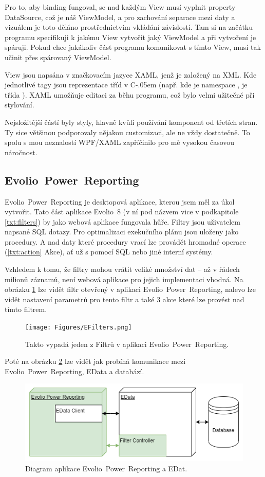 \documentclass[czech,bachelorpractice,dept460,male,csharp]{diploma}
\newcommand{\EvolioEight}{Evolio~8}
\newcommand{\EFilters}{Evolio~Power~Reporting}
\newcommand{\EData}{EData}
\newcommand{\Csharp}{%
  {\settoheight{\dimen0}{C}C\kern-.05em \resizebox{!}{\dimen0}{\raisebox{\depth}{\#}}}}
\begin{document}
			Pro to, aby binding fungoval, se nad každým View musí vyplnit property DataSource, což je náš ViewModel, a pro zachování separace mezi daty a vizuálem je toto děláno prostřednictvím vkládání závislostí. Tam si na začátku programu specifikuji k jakému View vytvořit jaký ViewModel a při vytvoření je spáruji. Pokud chce jakákoliv část programu komunikovat s tímto View, musí tak učinit přes spárovaný ViewModel.
			
			View jsou napsána v značkovacím jazyce XAML\cite{xaml}, jenž je založený na XML. Kde jednotlivé tagy jsou reprezentace tříd v {\Csharp} (např.  kde  je namespace , je třída  ). XAML umožňuje editaci za běhu programu, což bylo velmi užitečné při stylování. 
			
			Nejsložitější částí byly styly, hlavně kvůli používání komponent od třetích stran. Ty sice většinou podporovaly nějakou customizaci, ale ne vždy dostatečně. To spolu s mou neznalostí WPF/XAML zapříčinilo pro mě vysokou časovou náročnost.
	\subsection{\EFilters}
		{\EFilters} je desktopová aplikace, kterou jsem měl za úkol vytvořit. Tato část aplikace {\EvolioEight} (v ní pod názvem  vice v podkapitole \ref{txt:filters}) by jako webová aplikace fungovala hůře.
		Filtry jsou uživatelem napsané SQL dotazy. Pro optimalizaci exekučního plánu jsou uloženy jako procedury. A nad daty které procedury vrací lze provádět hromadné operace (\ref{txt:action} Akce), ať už s pomocí SQL nebo jiné interní systémy.
		
		Vzhledem k tomu, že filtry mohou vrátit veliké množství dat – až v řádech milionů záznamů, není webová aplikace pro jejich implementaci vhodná. Na obrázku \ref{fig:EFilters} lze vidět filtr otevřený v aplikaci {\EFilters}, nalevo lze vidět nastavení parametrů pro tento filtr a také 3 akce které lze provést nad tímto filtrem.

			
			\begin{figure}[h!]
				\texttt{[image: Figures/EFilters.png]}
				\caption{Takto vypadá jeden z Filtrů v aplikaci {\EFilters}.}
    			\label{fig:EFilters}
			\end{figure}
					Poté na obrázku \ref{fig:EFiltersDiagram} lze vidět jak probíhá komunikace mezi \EFilters, {\EData} a databází.
			\begin{figure}[h]
				\includegraphics[width=1.0\textwidth]{Figures/EfiltersDiagram.png}
				\caption{Diagram aplikace {\EFilters} a EDat.}
    			\label{fig:EFiltersDiagram}
			\end{figure}
\end{document}
